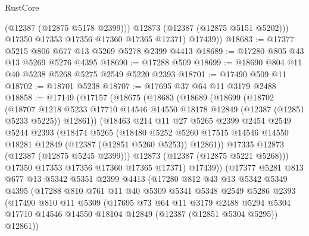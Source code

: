 \begin{lexlean}{RustCore}
\begin{coremodule}
              (@12387 (@12875 @5178 @2399)))
            @12873
            (@12387 (@12875 @5151 @5202)))
          @17350
          @17353
          @17356
          @17360
          @17365
          @17371)
        @17439))
@18683 := @17377 @5215 @806 @677 @13 @5269 @5278 @2399 @4413
@18689 := @17280 @805 @43 @13 @5269 @5276 @4395
@18690 := @17288 @509
@18699 := @18690 @804 @11 @40 @5238 @5268 @5275 @2549 @5220 @2393
@18701 := @17490 @509 @11
@18702 := @18701 @5238
@18707 := @17695 @37 @64 @11 @3179 @2488
@18858 := @17149
    (@17157
      (@18675
        (@18683
          (@18689
            (@18699
              (@18702
                (@18707
                  @1218
                  @5233
                  @17710
                  @14546
                  @14550
                  @18178
                  @12849
                  (@12387 (@12851 @5233 @5225))
                  @12861))
              (@18463
                @214
                @11
                @27
                @5265
                @2399
                @2454
                @2549
                @5244
                @2393
                (@18474
                  @5265
                  (@18480
                    @5252
                    @5260
                    @17515
                    @14546
                    @14550
                    @18281
                    @12849
                    (@12387 (@12851 @5260 @5253))
                    @12861))
                @17335
                @12873
                (@12387 (@12875 @5245 @2399)))
              @12873
              (@12387 (@12875 @5221 @5268)))
            @17350
            @17353
            @17356
            @17360
            @17365
            @17371)
          @17439))
      (@17377
        @5281
        @813
        @677
        @13
        @5342
        @5351
        @2399
        @4413
        (@17280
          @812
          @43
          @13
          @5342
          @5349
          @4395
          (@17288
            @810
            @761
            @11
            @40
            @5309
            @5341
            @5348
            @2549
            @5286
            @2393
            (@17490
              @810
              @11
              @5309
              (@17695
                @73
                @64
                @11
                @3179
                @2488
                @5294
                @5304
                @17710
                @14546
                @14550
                @18104
                @12849
                (@12387 (@12851 @5304 @5295))
                @12861))

\end{coremodule}
\end{lexlean}
